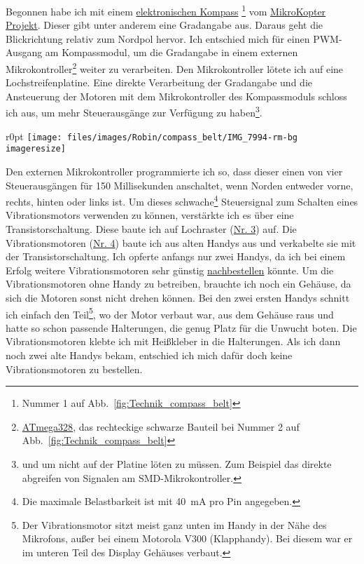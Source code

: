 Begonnen habe ich mit einem
\href{http://www.mikrokopter.de/ucwiki/MK3Mag}{elektronischen Kompass}%
\footnote{Nummer 1 auf Abb.~\vref{fig:Technik_compass_belt}}
vom \href{http://www.mikrokopter.de}{MikroKopter Projekt}.
Dieser gibt unter anderem eine Gradangabe aus. Daraus geht die Blickrichtung relativ zum Nordpol
hervor. Ich entschied mich für einen PWM-Ausgang am Kompassmodul, um die Gradangabe in einem
externen Mikrokontroller\footnote{\href{http://www.atmel.com/Images/doc8161.pdf}{ATmega328}, das
rechteckige schwarze Bauteil bei Nummer 2 auf Abb.~\vref{fig:Technik_compass_belt}}
weiter zu verarbeiten. Den Mikrokontroller lötete ich auf eine
Lochstreifenplatine. Eine direkte Verarbeitung der Gradangabe und die Ansteuerung der Motoren mit
dem Mikrokontroller des Kompassmoduls schloss ich aus, um mehr Steuerausgänge zur Verfügung zu
haben\footnote{und um nicht auf der Platine löten zu müssen. Zum Beispiel das direkte abgreifen
von Signalen am SMD-Mikrokontroller.}.

\begin{wrapfigure}{r}{0pt}
	\texttt{[image: files/images/Robin/compass\_belt/IMG\_7994-rm-bg\\imageresize]}
	\label{fig:Technik_compass_belt}
\end{wrapfigure}
Den externen Mikrokontroller programmierte ich so, dass dieser einen von vier Steuerausgängen
für 150 Millisekunden anschaltet, wenn Norden entweder vorne, rechts, hinten oder links ist.
Um dieses schwache\footnote{Die maximale Belastbarkeit ist mit \SI{40}{\milli\ampere} pro Pin
angegeben.}
Steuersignal zum Schalten eines Vibrationsmotors verwenden zu können, verstärkte ich es über eine
Transistorschaltung. Diese baute ich auf Lochraster (\hyperref[fig:Technik_compass_belt]{Nr. 3})
auf. Die Vibrationsmotoren (\hyperref[fig:Technik_compass_belt]{Nr. 4}) baute ich aus alten
Handys
aus und verkabelte sie mit der Transistorschaltung. Ich opferte anfangs nur zwei Handys, da ich
bei einem Erfolg weitere Vibrationsmotoren sehr günstig
\href{http://www.pollin.de/shop/dt/NDA2OTg2OTk-/Motoren/%
	Gleichstrommotoren/Vibrationsmotor_LA4_432A.html}{nachbestellen}
könnte.
Um die Vibrationsmotoren ohne Handy zu betreiben, brauchte ich noch ein Gehäuse, da sich die Motoren
sonst nicht drehen können. Bei den zwei ersten Handys schnitt ich einfach den Teil\footnote{Der Vibrationsmotor
sitzt meist ganz unten im Handy in der Nähe des Mikrofons, außer bei einem Motorola V300 (Klapphandy). Bei
diesem war er im unteren Teil des Display Gehäuses verbaut.}, wo der Motor verbaut war, aus dem Gehäuse
raus und hatte so schon passende Halterungen, die genug Platz für die Unwucht boten. Die Vibrationsmotoren
klebte ich mit Heißkleber in die Halterungen. Als ich dann noch zwei alte Handys %
bekam, entschied ich mich dafür doch keine Vibrationsmotoren zu bestellen.

